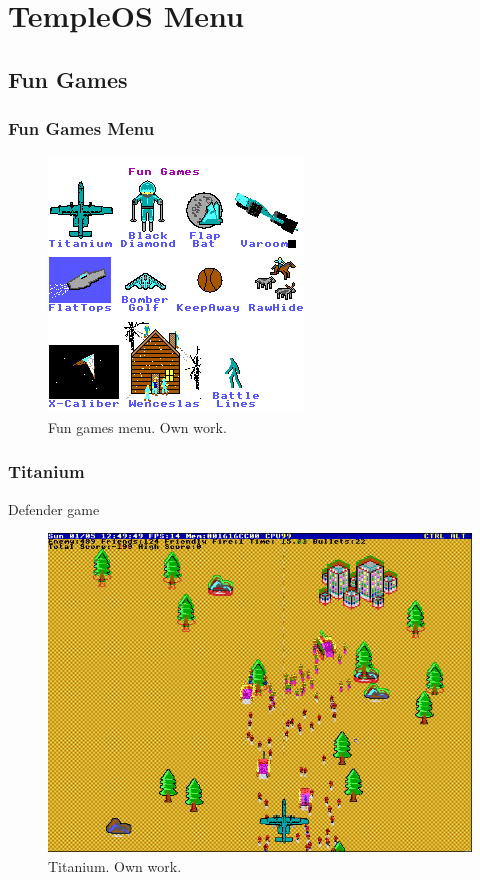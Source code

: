 \documentclass{beamer}
\begin{document}
	\section[TOS Menu]{TempleOS Menu}
	\subsection{Fun Games}
	\begin{frame}
		\frametitle{Fun Games Menu}
		\begin{figure}
			\centering
			\includegraphics[width=0.6\linewidth]{images/fun_games.png}
			\caption{Fun games menu. Own work.}
			\label{fig:fun_games}
		\end{figure}
	\end{frame}

	\begin{frame}
		\frametitle{Titanium}
		Defender game
		\begin{figure}
			\centering
			\includegraphics[width=0.6\linewidth]{images/titanium.png}
			\caption{Titanium. Own work.}
			\label{fig:titanium}
		\end{figure}
	\end{frame}
\end{document}
